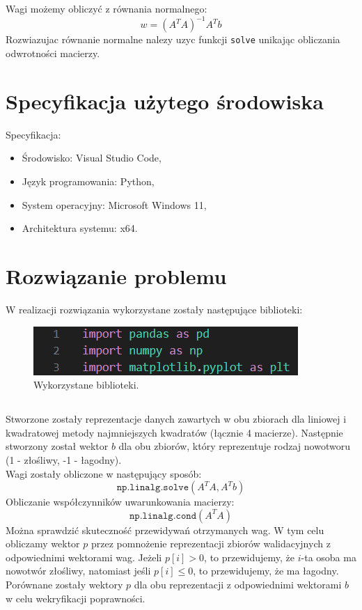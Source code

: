 \documentclass[11pt]{scrartcl}
\begin{document}
    \subsection*{}
    Wagi możemy obliczyć z równania normalnego:
    \[
        w=(A^TA)^{-1}A^Tb
    \]
    Rozwiazujac równanie normalne nalezy uzyc funkcji \texttt{solve} unikając
    obliczania odwrotności macierzy.

    \section{Specyfikacja użytego środowiska}
    Specyfikacja:

    \begin{itemize}
        \item Środowisko: Visual Studio Code,
        \item Język programowania: Python,
        \item System operacyjny: Microsoft Windows 11,
        \item Architektura systemu: x64.
    \end{itemize}

    \section{Rozwiązanie problemu}
    W realizacji rozwiązania wykorzystane zostały następujące biblioteki:
    \begin{figure}[H]
        \includegraphics[width=0.6\linewidth]{libs2.png}
        \caption{Wykorzystane biblioteki.}
    \end{figure}

    \subsection*{}
    Stworzone zostały reprezentacje danych zawartych w obu zbiorach dla liniowej
    i kwadratowej metody najmniejszych kwadratów (łącznie 4 macierze). Następnie
    stworzony został wektor $b$ dla obu zbiorów, który reprezentuje rodzaj
    nowotworu (1 - złośliwy, -1 - łagodny). \\
    Wagi zostały obliczone w następujący sposób:
    \[
        \texttt{np.linalg.solve}(A^TA,A^Tb)
    \]
    Obliczanie współczynników uwarunkowania macierzy:
    \[
        \texttt{np.linalg.cond}(A^TA)
    \]
    Można sprawdzić skuteczność przewidywań otrzymanych wag. W tym celu
    obliczamy wektor $p$ przez pomnożenie reprezentacji zbiorów walidacyjnych
    z odpowiednimi wektorami wag. Jeżeli $p[i] > 0$, to przewidujemy, że $i$-ta
    osoba ma nowotwór złośliwy, natomiast jeśli $p[i] \leq 0$, to przewidujemy,
    że ma łagodny. Porównane zostały wektory $p$ dla obu reprezentacji
    z odpowiednimi wektorami $b$ w celu wekryfikacji poprawności.
\end{document}
